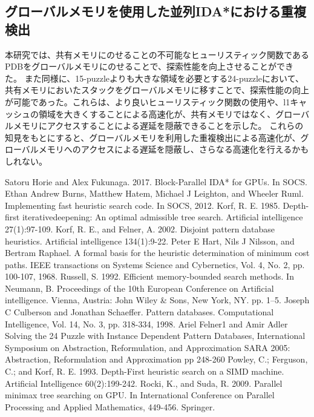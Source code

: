 \documentclass[a4paper,11pt,oneside,openany]{jsbook}
\begin{document}
\subsection{グローバルメモリを使用した並列IDA*における重複検出}
本研究では、共有メモリにのせることの不可能なヒューリスティック関数であるPDBをグローバルメモリにのせることで、探索性能を向上させることができた。
また同様に、15-puzzleよりも大きな領域を必要とする24-puzzleにおいて、共有メモリにおいたスタックをグローバルメモリに移すことで、探索性能の向上が可能であった。これらは、より良いヒューリスティック関数の使用や、l1キャッシュの領域を大きくすることによる高速化が、共有メモリではなく、グローバルメモリにアクセスすることによる遅延を隠蔽できることを示した。
これらの知見をもとにすると、グローバルメモリを利用した重複検出による高速化が、グローバルメモリへのアクセスによる遅延を隠蔽し、さらなる高速化を行えるかもしれない。


\begin{thebibliography}{10}
   Satoru Horie and Alex Fukunaga. 2017. Block-Parallel IDA* for GPUs. In SOCS.
  Ethan Andrew Burns, Matthew Hatem, Michael J Leighton, and Wheeler Ruml. Implementing fast heuristic search code. In SOCS, 2012.
  Korf, R. E. 1985. Depth-first iterativedeepening: An optimal admissible tree search. Artificial intelligence 27(1):97-109.
  Korf, R. E., and Felner, A. 2002. Disjoint pattern database heuristics. Artificial intelligence 134(1):9-22.
  Peter E Hart, Nils J Nilsson, and Bertram Raphael. A formal basis for the heuristic determination of minimum cost paths. IEEE transactions on Systems Science and Cybernetics, Vol. 4, No. 2, pp. 100-107, 1968. 
  Russell, S. 1992. Efficient memory-bounded search methods. In Neumann, B. Proceedings of the 10th European Conference on Artificial intelligence. Vienna, Austria: John Wiley \& Sons, New York, NY. pp. 1–5.
  Joseph C Culberson and Jonathan Schaeffer. Pattern databases. Computational Intelligence, Vol. 14, No. 3, pp. 318-334, 1998.
  Ariel Felner1 and Amir Adler Solving the 24 Puzzle with Instance Dependent Pattern Databases, International Symposium on Abstraction, Reformulation, and Approximation SARA 2005: Abstraction, Reformulation and Approximation pp 248-260
  \bibitem{Powley, Ferguson and Korf 1993]} Powley, C.; Ferguson, C.; and Korf, R. E. 1993. Depth-First heuristic search on a SIMD machine. Artificial Intelligence 60(2):199-242.
  Rocki, K., and Suda, R. 2009. Parallel minimax tree searching on GPU. In International Conference on Parallel Processing and Applied Mathematics, 449-456. Springer.



\end{thebibliography}
\end{document}
